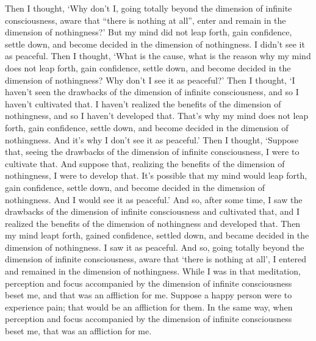 \documentclass[12pt,openany]{book}%
\begin{document}
Then I thought, ‘Why don’t I, going totally beyond the dimension of infinite consciousness, aware that “there is nothing at all”, enter and remain in the dimension of nothingness?’ But my mind did not leap forth, gain confidence, settle down, and become decided in the dimension of nothingness. I didn’t see it as peaceful. Then I thought, ‘What is the cause, what is the reason why my mind does not leap forth, gain confidence, settle down, and become decided in the dimension of nothingness? Why don’t I see it as peaceful?’ Then I thought, ‘I haven’t seen the drawbacks of the dimension of infinite consciousness, and so I haven’t cultivated that. I haven’t realized the benefits of the dimension of nothingness, and so I haven’t developed that. That’s why my mind does not leap forth, gain confidence, settle down, and become decided in the dimension of nothingness. And it’s why I don’t see it as peaceful.’ Then I thought, ‘Suppose that, seeing the drawbacks of the dimension of infinite consciousness, I were to cultivate that. And suppose that, realizing the benefits of the dimension of nothingness, I were to develop that. It’s possible that my mind would leap forth, gain confidence, settle down, and become decided in the dimension of nothingness. And I would see it as peaceful.’ And so, after some time, I saw the drawbacks of the dimension of infinite consciousness and cultivated that, and I realized the benefits of the dimension of nothingness and developed that. Then my mind leapt forth, gained confidence, settled down, and became decided in the dimension of nothingness. I saw it as peaceful. And so, going totally beyond the dimension of infinite consciousness, aware that ‘there is nothing at all’, I entered and remained in the dimension of nothingness. While I was in that meditation, perception and focus accompanied by the dimension of infinite consciousness beset me, and that was an affliction for me. Suppose a happy person were to experience pain; that would be an affliction for them. In the same way, when perception and focus accompanied by the dimension of infinite consciousness beset me, that was an affliction for me. 
\end{document}
